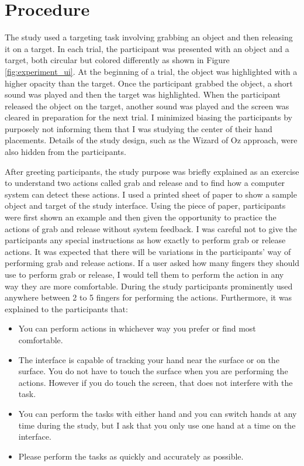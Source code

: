 \section{Procedure}
The study used a targeting task involving grabbing an object and then releasing it on a target.  
In each trial, the participant was presented with an object and a target, both circular but colored differently as shown in Figure \ref{fig:experiment_ui}.  
At the beginning of a trial, the object was highlighted with a higher opacity than the target.  
Once the participant grabbed the object, a short sound was played and then the target was highlighted.
When the participant released the object on the target, another sound was played and the screen was cleared in preparation for the next trial.
I minimized biasing the participants by purposely not informing them that I was studying the center of their hand placements.  
Details of the study design, such as the Wizard of Oz approach, were also hidden from the participants.  

After greeting participants, the study purpose was briefly explained as an exercise to understand two actions called grab and release and to find how a computer system can detect these actions.
I used a printed sheet of paper to show a sample object and target of the study interface.
Using the piece of paper, participants were first shown an example and then given the opportunity to practice the actions of grab and release without system feedback.
I was careful not to give the participants any special instructions as how exactly to perform grab or release actions.
It was expected that there will be variations in the participants' way of
performing grab and release actions.
If a user asked how many fingers they should use to perform grab or release, I
would tell them to perform the action in any way they are more comfortable.
During the study participants prominently used anywhere between 2 to 5 fingers for performing the actions.
Furthermore, it was explained to the participants that:
\begin{itemize}
 \item You can perform actions in whichever way you prefer or find most comfortable.
 \item The interface is capable of tracking your hand near the surface or on the surface. You do not have to touch the surface when you are performing the actions. However if you do touch the screen, that does not interfere with the task.
 \item You can perform the tasks with either hand and you can switch hands at any time during the study, but I ask that you only use one hand at a time on the interface.
 \item Please perform the tasks as quickly and accurately as possible.
\end{itemize}

